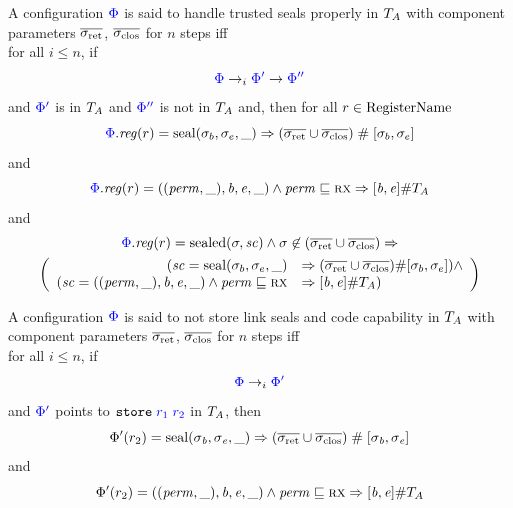 \documentclass[a4paper]{article}
\begin{document}
\begin{definition}
  \label{def:handle-trusted-seals-properly}
  A configuration $\src{\Phi}$ is said to handle trusted seals properly in $\ta$ with component parameters $\sigrets$, $\sigcloss$ for $n$ steps iff\\
  for all $i \leq n$, if
  \[
    \src{\Phi} \nstep[i] \src{\Phi'} \step \src{\Phi''}
  \]
  and $\src{\Phi'}$ is in $\ta$ and $\src{\Phi''}$ is not in $\ta$ and, then for all $r \in \RegName$
  \[
    \src{\Phi}.\reg(r) = \seal{\sigma_b,\sigma_e,\_} \Rightarrow (\sigrets \cup \sigcloss) \mathrel{\#} [\sigma_b,\sigma_e]
  \]
and
  \[
    \src{\Phi}.\reg(r) = ((\perm,\_),\baddr,\eaddr,\_) \wedge \perm \sqsubseteq \rx \Rightarrow [\baddr,\eaddr] \# \ta
  \]
  and
    \begin{multline*}
      \src{\Phi}.\reg(r) = \sealed{\sigma,\vsc} \wedge \sigma \not\in (\sigrets\cup\sigcloss) \Rightarrow 
      \\  \left(  
      \begin{array}{r l}
        (\vsc = \seal{\sigma_b,\sigma_e,\_} & \Rightarrow (\sigrets\cup\sigcloss) \# [\sigma_b,\sigma_e]) \wedge\\
        ( \vsc = ((\perm,\_),\baddr,\eaddr,\_) \wedge \perm \sqsubseteq \rx & \Rightarrow [\baddr,\eaddr] \# \ta )
      \end{array}
      \right)
  \end{multline*}
\end{definition}

\begin{definition}
  \label{def:never-store-seal-code-cap}
  A configuration $\src{\Phi}$ is said to not store link seals and code capability in $\ta$ with component parameters $\sigrets$, $\sigcloss$ for $n$ steps iff\\
  for all $i \leq n$, if
  \[
    \src{\Phi} \nstep[i] \src{\Phi'}
  \]
  and $\src{\Phi'}$ points to $\src{\tstore{r_1}{r_2}}$ in $\ta$, then 
\[
  \Phi'(r_2) = \seal{\sigma_\baddr,\sigma_\eaddr,\_} \Rightarrow (\sigrets\cup\sigcloss) \mathrel{\#} [\sigma_\baddr,\sigma_\eaddr]
\]
and
\[
  \Phi'(r_2) = ((\perm,\_),\baddr,\eaddr,\_) \wedge \perm \sqsubseteq \rx \Rightarrow [\baddr,\eaddr] \# \ta
\]
\end{definition}
\end{document}
